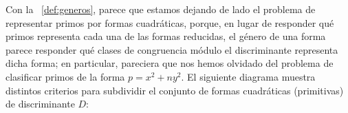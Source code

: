 \begin{obsGeneros}\label{obs:generos}
	Con la ~\ref{def:generos}, parece que estamos
	dejando de lado el problema de representar primos por formas
	cuadr\'aticas, porque, en lugar de responder qu\'e primos
	representa cada una de las formas reducidas, el g\'enero de una
	forma parece responder qu\'e clases de congruencia m\'odulo
	el discriminante representa dicha forma;
	en particular, pareciera que nos hemos 	olvidado del problema
	de clasificar primos de la forma $p=x^2+ny^2$.
	El siguiente diagrama muestra distintos criterios para
	subdividir el conjunto de formas cuadr\'aticas (primitivas)
	de discriminante $D$:
	\begin{center}
		\dispstop
	\end{center}
\end{obsGeneros}

